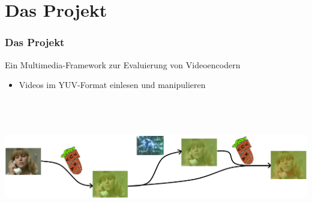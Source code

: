 \documentclass[t]{beamer}
\begin{document}
\section{Das Projekt}
\begin{frame}
	\frametitle{Das Projekt}
	\begin{center}
		Ein Multimedia-Framework zur Evaluierung von Videoencodern	
	\end{center}
	 \newline
	\begin{itemize}
		\item<3-> Videos im YUV-Format einlesen und manipulieren
	\end{itemize}
	~\\
	~\\
	~\\
	\includegraphics[scale=.34]{YuvKA-Workchart.png}
\end{frame}
\end{document}
